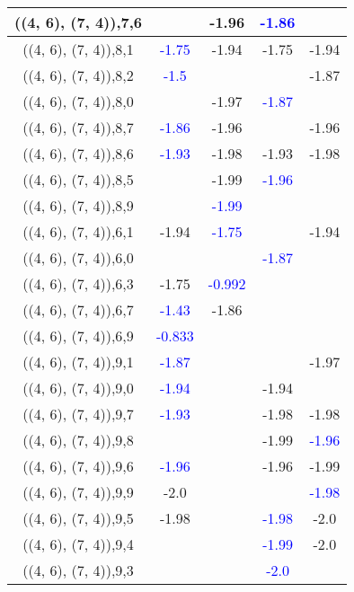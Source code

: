 \documentclass{article}
\begin{document}
\begin{center}
\begin{longtable}{|c|c|c|c|c|}
        	\hline
        	((4, 6), (7, 4)),7,6&&-1.96& \textcolor{blue}{-1.86}&\\
        	\hline
        	((4, 6), (7, 4)),8,1& \textcolor{blue}{-1.75}&-1.94&-1.75&-1.94\\
        	\hline
        	((4, 6), (7, 4)),8,2& \textcolor{blue}{-1.5}&&&-1.87\\
        	\hline
        	((4, 6), (7, 4)),8,0&&-1.97& \textcolor{blue}{-1.87}&\\
        	\hline
        	((4, 6), (7, 4)),8,7& \textcolor{blue}{-1.86}&-1.96&&-1.96\\
        	\hline
        	((4, 6), (7, 4)),8,6& \textcolor{blue}{-1.93}&-1.98&-1.93&-1.98\\
        	\hline
        	((4, 6), (7, 4)),8,5&&-1.99& \textcolor{blue}{-1.96}&\\
        	\hline
        	((4, 6), (7, 4)),8,9&& \textcolor{blue}{-1.99}&&\\
        	\hline
        	((4, 6), (7, 4)),6,1&-1.94& \textcolor{blue}{-1.75}&&-1.94\\
        	\hline
        	((4, 6), (7, 4)),6,0&&& \textcolor{blue}{-1.87}&\\
        	\hline
        	((4, 6), (7, 4)),6,3&-1.75& \textcolor{blue}{-0.992}&&\\
        	\hline
        	((4, 6), (7, 4)),6,7& \textcolor{blue}{-1.43}&-1.86&&\\
        	\hline
        	((4, 6), (7, 4)),6,9& \textcolor{blue}{-0.833}&&&\\
        	\hline
        	((4, 6), (7, 4)),9,1& \textcolor{blue}{-1.87}&&&-1.97\\
        	\hline
        	((4, 6), (7, 4)),9,0& \textcolor{blue}{-1.94}&&-1.94&\\
        	\hline
        	((4, 6), (7, 4)),9,7& \textcolor{blue}{-1.93}&&-1.98&-1.98\\
        	\hline
        	((4, 6), (7, 4)),9,8&&&-1.99& \textcolor{blue}{-1.96}\\
        	\hline
        	((4, 6), (7, 4)),9,6& \textcolor{blue}{-1.96}&&-1.96&-1.99\\
        	\hline
        	((4, 6), (7, 4)),9,9&-2.0&&& \textcolor{blue}{-1.98}\\
        	\hline
        	((4, 6), (7, 4)),9,5&-1.98&& \textcolor{blue}{-1.98}&-2.0\\
        	\hline
        	((4, 6), (7, 4)),9,4&&& \textcolor{blue}{-1.99}&-2.0\\
        	\hline
        	((4, 6), (7, 4)),9,3&&& \textcolor{blue}{-2.0}&\\

\end{longtable}
\end{center}
\end{document}

